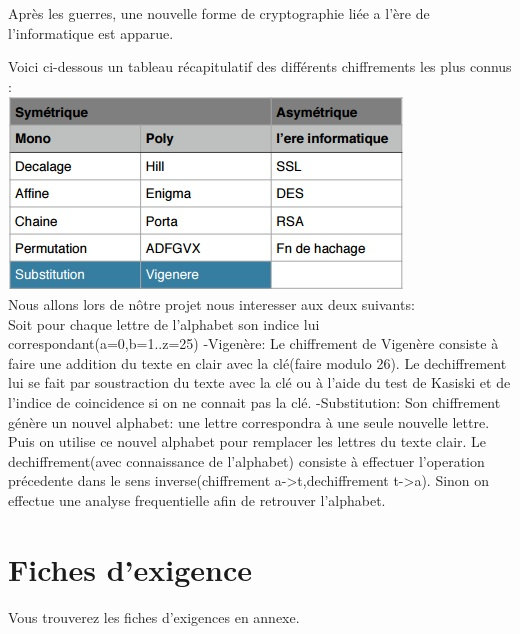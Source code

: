 \documentclass[a4]{article}
\begin{document}
				Après les guerres, une nouvelle forme de cryptographie liée a l'ère de l'informatique est apparue.
				
				Voici ci-dessous un tableau récapitulatif des différents chiffrements les plus connus :
				\\
				\includegraphics[scale=1]{Tab1.jpg}
				\\
				Nous allons lors de nôtre projet nous interesser aux deux suivants:\\
			Soit pour chaque lettre de l'alphabet son indice lui correspondant(a=0,b=1..z=25)			
			-Vigenère:
Le chiffrement de Vigenère consiste à faire une addition du texte en clair avec la clé(faire modulo 26).
Le dechiffrement lui se fait par soustraction du texte avec la clé ou à l'aide du test de Kasiski et de l'indice de coincidence si on ne connait pas la clé.
				-Substitution:
				Son chiffrement génère un nouvel alphabet: une lettre correspondra à une seule nouvelle lettre. Puis on utilise ce nouvel alphabet pour remplacer les lettres du texte clair.
				Le dechiffrement(avec connaissance de l'alphabet) consiste à effectuer l'operation précedente dans le sens inverse(chiffrement a->t,dechiffrement t->a). Sinon on effectue une analyse frequentielle afin de retrouver l'alphabet.
				
				
		\section{Fiches d'exigence}
				Vous trouverez les fiches d'exigences en annexe.
\end{document}
